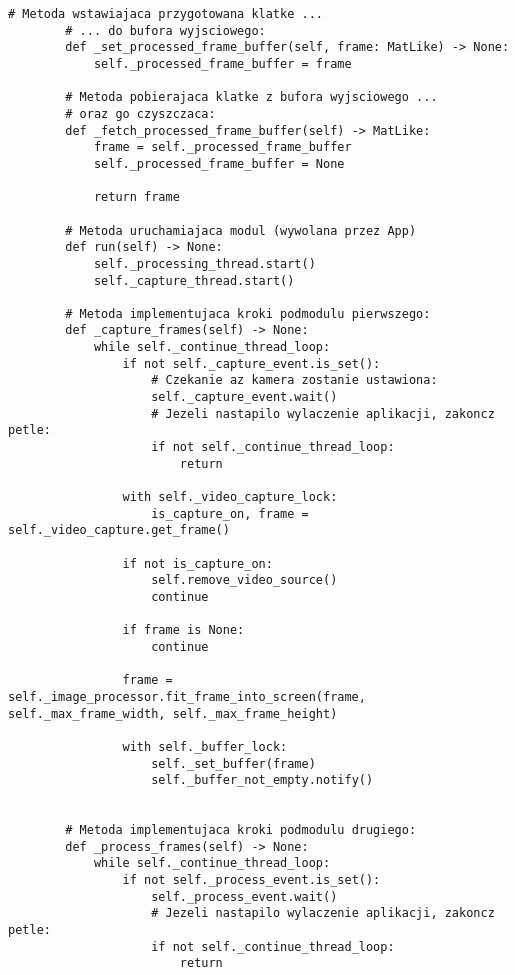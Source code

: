 \begin{lstlisting}[caption={Kod modułu silnika przetwarzania wideo z zawartymi mechanizami synchronizacji}, label={lst:engine-1}]
        # Metoda wstawiajaca przygotowana klatke ... 
        # ... do bufora wyjsciowego:
        def _set_processed_frame_buffer(self, frame: MatLike) -> None:
            self._processed_frame_buffer = frame
    
        # Metoda pobierajaca klatke z bufora wyjsciowego ... 
        # oraz go czyszczaca:
        def _fetch_processed_frame_buffer(self) -> MatLike:
            frame = self._processed_frame_buffer
            self._processed_frame_buffer = None
    
            return frame
    
        # Metoda uruchamiajaca modul (wywolana przez App)
        def run(self) -> None:
            self._processing_thread.start()
            self._capture_thread.start()
    
        # Metoda implementujaca kroki podmodulu pierwszego:
        def _capture_frames(self) -> None:
            while self._continue_thread_loop:
                if not self._capture_event.is_set():
                    # Czekanie az kamera zostanie ustawiona:
                    self._capture_event.wait()
                    # Jezeli nastapilo wylaczenie aplikacji, zakoncz petle: 
                    if not self._continue_thread_loop:
                        return
    
                with self._video_capture_lock:
                    is_capture_on, frame = self._video_capture.get_frame()
    
                if not is_capture_on:
                    self.remove_video_source()
                    continue
    
                if frame is None:
                    continue
    
                frame = self._image_processor.fit_frame_into_screen(frame, self._max_frame_width, self._max_frame_height)
                
                with self._buffer_lock:
                    self._set_buffer(frame)
                    self._buffer_not_empty.notify()
    
    
        # Metoda implementujaca kroki podmodulu drugiego:
        def _process_frames(self) -> None:
            while self._continue_thread_loop:
                if not self._process_event.is_set():
                    self._process_event.wait()
                    # Jezeli nastapilo wylaczenie aplikacji, zakoncz petle:
                    if not self._continue_thread_loop:
                        return
    

\end{lstlisting}
